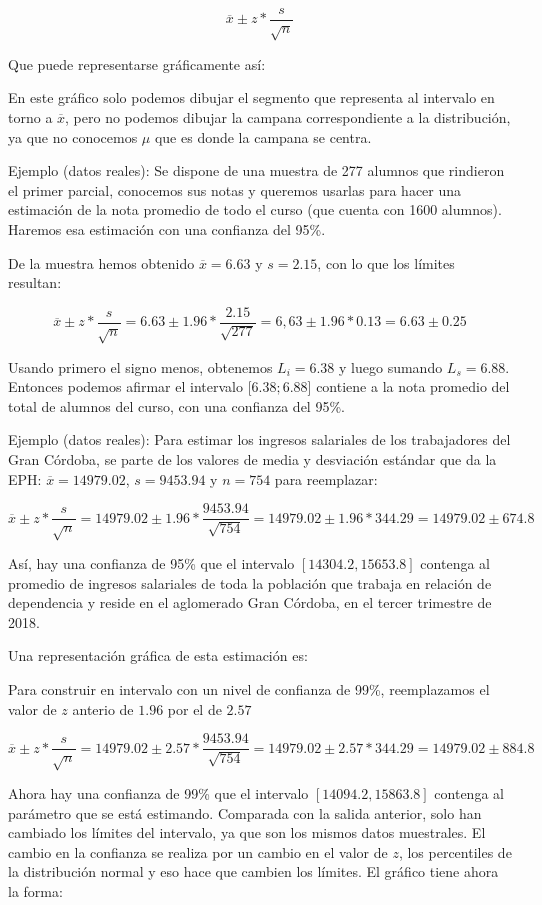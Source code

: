 \documentclass[]{book}
\begin{document}
\[\overline{x} \pm z*\frac{s}{\sqrt{n}}\]

Que puede representarse gráficamente así:

En este gráfico solo podemos dibujar el segmento que representa al
intervalo en torno a \(\overline{x}\), pero no podemos dibujar la campana
correspondiente a la distribución, ya que no conocemos \(\mu\) que es
donde la campana se centra.

Ejemplo (datos reales): Se dispone de una muestra de 277 alumnos que
rindieron el primer parcial, conocemos sus notas y queremos usarlas para
hacer una estimación de la nota promedio de todo el curso (que cuenta
con 1600 alumnos). Haremos esa estimación con una confianza del 95\%.

De la muestra hemos obtenido \(\overline{x} = 6.63\) y \(s = 2.15\), con lo
que los límites resultan:

\[\overline{x} \pm z*\frac{s}{\sqrt{n}} = 6.63 \pm 1.96*\frac{2.15}{\sqrt{277}} = 6,63 \pm 1.96*0.13 = 6.63 \pm 0.25\]

Usando primero el signo menos, obtenemos \(L_i= 6.38\) y luego sumando
\(L_s = 6.88\). Entonces podemos afirmar el intervalo \([6.38; 6.88\){]} contiene a la nota promedio del total de alumnos del curso, con una confianza del 95\%.

Ejemplo (datos reales): Para estimar los ingresos salariales de los trabajadores del Gran Córdoba, se parte de los valores de media y desviación estándar que da la EPH: \(\overline{x} = 14979.02\), \(s=9453.94\) y \(n=754\) para reemplazar:

\[\overline{x} \pm z*\frac{s}{\sqrt{n}} = 14979.02 \pm 1.96*\frac{9453.94}{\sqrt{754}} = 14979.02 \pm 1.96*344.29 = 14979.02 \pm 674.8\]

Así, hay una confianza de 95\% que el intervalo \([14304.2, 15653.8]\) contenga al promedio de ingresos salariales de toda la población que trabaja en relación de dependencia y reside en el aglomerado Gran Córdoba, en el tercer trimestre de 2018.

Una representación gráfica de esta estimación es:

Para construir en intervalo con un nivel de confianza de 99\%, reemplazamos el valor de \(z\) anterio de \(1.96\) por el de \(2.57\)

\[\overline{x} \pm z*\frac{s}{\sqrt{n}} = 14979.02 \pm 2.57*\frac{9453.94}{\sqrt{754}} = 14979.02 \pm 2.57*344.29 = 14979.02 \pm 884.8\]

Ahora hay una confianza de 99\% que el intervalo \([14094.2, 15863.8]\) contenga al parámetro que se está estimando. Comparada con la salida anterior, solo han cambiado los límites del intervalo, ya que son los mismos datos muestrales. El cambio en la confianza se realiza por un cambio en el valor de \(z\), los percentiles de la distribución normal y eso hace que cambien los límites. El gráfico tiene ahora la forma:
\end{document}
